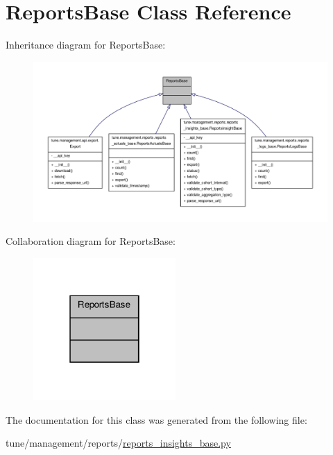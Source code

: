 \hypertarget{classReportsBase}{\section{Reports\-Base Class Reference}
\label{classReportsBase}
}


Inheritance diagram for Reports\-Base\-:
\nopagebreak
\begin{figure}[H]
\begin{center}
\leavevmode
\includegraphics[width=350pt]{classReportsBase__inherit__graph}
\end{center}
\end{figure}


Collaboration diagram for Reports\-Base\-:
\nopagebreak
\begin{figure}[H]
\begin{center}
\leavevmode
\includegraphics[width=154pt]{classReportsBase__coll__graph}
\end{center}
\end{figure}


The documentation for this class was generated from the following file\-:\begin{DoxyCompactItemize}
\item 
tune/management/reports/\hyperlink{reports__insights__base_8py}{reports\-\_\-insights\-\_\-base.\-py}\end{DoxyCompactItemize}
